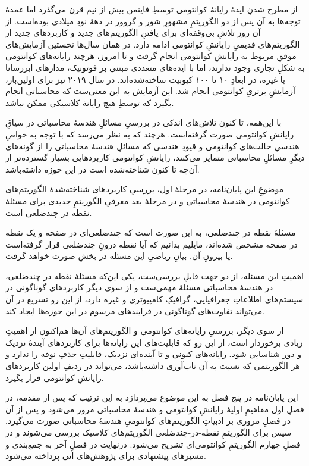 

از مطرح شدنِ ایدهٔ رایانهٔ کوانتومی توسطِ فاینمن  بیش از نیم قرن می‌گذرد اما عمدهٔ توجه‌ها به آن پس از دو الگوریتمِ مشهورِ شور  و گروور  در دههٔ نودِ میلادی بوده‌است. از آن روز تلاشِ بی‌وقفه‌ای برای یافتنِ الگوریتم‌های جدید و کاربردهای جدید از الگوریتم‌های قدیمیِ رایانشِ کوانتومی ادامه دارد. در همان سال‌ها نخستین آزمایش‌های موفقِ مربوط به رایانشِ کوانتومی انجام گرفت  و تا امروز، هرچند رایانه‌های کوانتومی به شکلِِ تجاری وجود ندارند، اما با ایده‌های متعددی مبتنی بر فوتونیک، مدارهای ابررسانا یا غیره، در ابعادِ ۱۰ تا ۱۰۰ کیوبیت  ساخته‌شده‌اند. 
در سال ۲۰۱۹ نیز برای اولین‌بار، آزمایشِ برتریِ کوانتومی انجام شد.  این آزمایش به این معنی‌ست که محاسباتی انجام بگیرد که توسطِ هیچ رایانهٔ کلاسیکی ممکن نباشد.

با این‌همه، تا کنون تلاش‌های اندکی در بررسیِ مسائلِ هندسهٔ محاسباتی در سیاقِ رایانشِ کوانتومی صورت گرفته‌است. هرچند که به نظر می‌رسد که با توجه به خواصِ هندسیِ حالت‌های کوانتومی و قیودِ هندسی که مسائلِ هندسهٔ محاسباتی را از گونه‌های دیگرِ مسائلِ محاسباتی متمایز می‌کنند، رایانشِ کوانتومی کاربردهایی بسیار گسترده‌تر از آن‌چه تا کنون شناخته‌شده است در این حوزه داشته‌باشد.


موضوعِ این پایان‌نامه، در مرحلهٔ اول، بررسیِ کاربردهای شناخته‌شدهٔ الگوریتم‌های کوانتومی در هندسهٔ محاسباتی و در مرحلهٔ بعد معرفیِ الگوریتمِ جدیدی برای مسئلهٔ نقطه در چندضلعی است.

مسئلهٔ نقطه در چندضلعی، به این صورت است که چندضلعی‌ای در صفحه و یک نقطه در صفحه مشخص شده‌اند، مایلیم بدانیم که آیا نقطه درونِ چندضلعی قرار گرفته‌است یا بیرونِ آن. بیانِ ریاضیِ این مسئله در بخشِ  صورت خواهد گرفت.


اهمیتِ این مسئله، از دو جهت قابلِ بررسی‌ست، یکی این‌که مسئلۀ نقطه در چندضلعی، در هندسهٔ محاسباتی مسئلهٔ مهمی‌ست و از سوی دیگر کاربردهای گوناگونی در سیستم‌های اطلاعاتِ جغرافیایی، گرافیکِ کامپیوتری و غیره دارد، از این رو تسریع در آن می‌تواند تفاوت‌های گوناگونی در فرایندهای مرسوم در این حوزه‌ها ایجاد کند.

از سوی دیگر، بررسیِ رایانه‌های کوانتومی و الگوریتم‌های آن‌ها هم‌اکنون از اهمیتِ زیادی برخوردار است، از این رو که قابلیت‌های این رایانه‌ها برای کاربردهای آیندهٔ نزدیک و دور شناسایی شود. رایانه‌های کنونی و تا آینده‌ای نزدیک، قابلیتِ حذفِ نوفه را ندارد و هر الگوریتمی که نسبت به آن تاب‌آوری داشته‌باشد، می‌تواند در ردیفِ اولین کاربردهای رایانشِ کوانتومی قرار بگیرد.


این پایان‌نامه در پنج فصل به این موضوع می‌پردازد به این ترتیب که پس از مقدمه، در فصلِ اول مفاهیمِ اولیهٔ رایانشِ کوانتومی و هندسهٔ محاسباتی مرور می‌شود و پس از آن در فصلِ مروری بر ادبیاتِ الگوریتم‌های کوانتومیِ هندسهٔ محاسباتی صورت می‌گیرد. سپس برای الگوریتمِ نقطه-در-چندضلعی الگوریتم‌های کلاسیک بررسی می‌شوند و در فصلِ چهارم الگوریتمِ کوانتومی‌ای تشریح می‌شود. درنهایت در فصلِ آخر به جمع‌بندی و مسیرهای پیشنهادی برای پژوهش‌های آتی پرداخته می‌شود.
